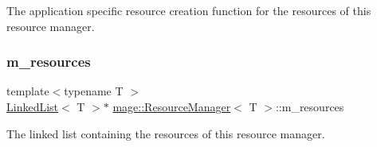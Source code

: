The application specific resource creation function for the resources of this resource manager. \hypertarget{classmage_1_1_resource_manager_a77b6bacdb28330b1587c7d18585fdea5}{}\label{classmage_1_1_resource_manager_a77b6bacdb28330b1587c7d18585fdea5} 
\subsubsection{\texorpdfstring{m\+\_\+resources}{m\_resources}}
{\footnotesize\ttfamily template$<$typename T $>$ \\
\hyperlink{classmage_1_1_linked_list}{Linked\+List}$<$ T $>$$\ast$ \hyperlink{classmage_1_1_resource_manager}{mage\+::\+Resource\+Manager}$<$ T $>$\+::m\+\_\+resources\hspace{0.3cm}{\ttfamily [private]}}

The linked list containing the resources of this resource manager. 